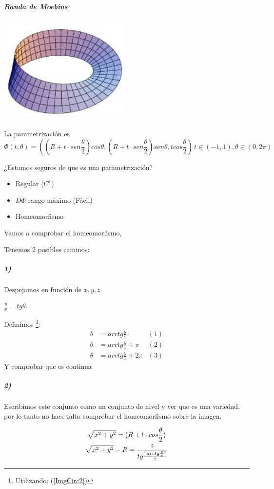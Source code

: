 \subparagraph{Banda de Moebius}
\begin{center}
\includegraphics[width=0.5\textwidth]{images.jpg}
\end{center}


La parametrización es 
\[
\Phi(t,\theta) = \left((R+t\cdot sen\frac{\theta}{2})cos\theta, (R+t\cdot sen\frac{\theta}{2})sen\theta, t cos\frac{\theta}{2} \right) \, t\in(-1,1),\theta\in(0,2\pi)
\]

¿Estamos seguros de que es una parametrización?
\begin{itemize}
\item Regular ($C^1$)
\item $D\Phi$ rango máximo (Fácil)
\item Homeomorfismo
\end{itemize}

Vamos a comprobar el homeomorfismo, 

Tenemos 2 posibles caminos:

\subparagraph{1)} Despejamos  en función de $x,y,z$

$\frac{y}{x} = tg \theta$.

Definimos \footnote{Utilizando: (\ref{ImgCirc2})}: \[
\begin{array}{ccc}
\theta &= arctg\frac{y}{x} & (1)\\
\theta &= arctg\frac{y}{x} + \pi & (2)\\
\theta &= arctg\frac{y}{x} + 2\pi & (3)
\end{array}
\]
Y comprobar que es continua


\subparagraph{2)} Escribimos este conjunto como un conjunto de nivel y ver que es una variedad, por lo tanto no hace falta comprobar el homeomorfismo sobre la imagen.

\begin{gather*}
\sqrt{x^2+y^2} = (R + t\cdot cos\frac{\theta}{2})\\
\sqrt{x^2+y^2} - R = \frac{z}{tg\frac{"arctg\frac{y}{x}"}{?}}
\end{gather*}


